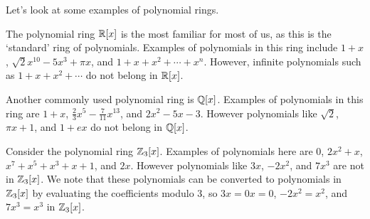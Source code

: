 Let's look at some examples of polynomial rings.
\begin{example}
    The polynomial ring $\mathbb{R}[x]$ is the most familiar for most of us, as this is the `standard' ring of polynomials. Examples of polynomials in this ring include $1+x$, $\sqrt2x^{10} - 5x^3 + \pi x$, and $1+x+x^2+\cdots+x^n$. However, infinite polynomials such as $1+x+x^2+\cdots$ do not belong in $\mathbb{R}[x]$.
\end{example}
\begin{example}
    Another commonly used polynomial ring is $\mathbb{Q}[x]$. Examples of polynomials in this ring are $1+x$, $\frac23x^5 - \frac7{11}x^{13}$, and $2x^2-5x-3$. However polynomials like $\sqrt2$, $\pi x + 1$, and $1+ex$ do not belong in $\mathbb{Q}[x]$.
\end{example}
\begin{example}
    Consider the polynomial ring $\mathbb{Z}_3[x]$. Examples of polynomials here are 0, $2x^2 + x$, $x^7+x^5+x^3+x+1$, and $2x$. However polynomials like $3x$, $-2x^2$, and $7x^3$ are not in $\mathbb{Z}_3[x]$. We note that these polynomials can be converted to polynomials in $\mathbb{Z}_3[x]$ by evaluating the coefficients modulo 3, so $3x = 0x = 0$, $-2x^2 = x^2$, and $7x^3 = x^3$ in $\mathbb{Z}_3[x]$.
\end{example}

